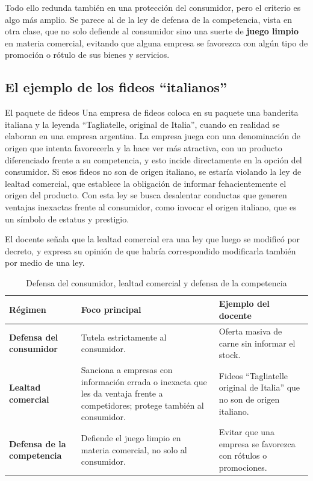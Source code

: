\documentclass[12pt,oneside]{book}
\begin{document}
Todo ello redunda también en una protección del consumidor, pero el criterio es algo más amplio. Se parece al de la ley de defensa de la competencia, vista en otra clase, que no solo defiende al consumidor sino una suerte de \textbf{juego limpio} en materia comercial, evitando que alguna empresa se favorezca con algún tipo de promoción o rótulo de sus bienes y servicios.

\subsection{El ejemplo de los fideos ``italianos''}

\begin{example}{El paquete de fideos}
Una empresa de fideos coloca en su paquete una banderita italiana y la leyenda ``Tagliatelle, original de Italia'', cuando en realidad se elaboran en una empresa argentina. La empresa juega con una denominación de origen que intenta favorecerla y la hace ver más atractiva, con un producto diferenciado frente a su competencia, y esto incide directamente en la opción del consumidor. Si esos fideos no son de origen italiano, se estaría violando la ley de lealtad comercial, que establece la obligación de informar fehacientemente el origen del producto. Con esta ley se busca desalentar conductas que generen ventajas inexactas frente al consumidor, como invocar el origen italiano, que es un símbolo de estatus y prestigio.
\end{example}

El docente señala que la lealtad comercial era una ley que luego se modificó por decreto, y expresa su opinión de que habría correspondido modificarla también por medio de una ley.

\begin{table}[H]
\centering
\caption{Defensa del consumidor, lealtad comercial y defensa de la competencia}
\small
\begin{tabularx}{\textwidth}{
    >{\raggedright\arraybackslash}p{}
    >{\raggedright\arraybackslash}X
    >{\raggedright\arraybackslash}X
}
\toprule
\textbf{Régimen} & \textbf{Foco principal} & \textbf{Ejemplo del docente} \\
\midrule
\textbf{Defensa del consumidor} & Tutela estrictamente al consumidor. & Oferta masiva de carne sin informar el stock. \\
\textbf{Lealtad comercial} & Sanciona a empresas con información errada o inexacta que les da ventaja frente a competidores; protege también al consumidor. & Fideos ``Tagliatelle original de Italia'' que no son de origen italiano. \\
\textbf{Defensa de la competencia} & Defiende el juego limpio en materia comercial, no solo al consumidor. & Evitar que una empresa se favorezca con rótulos o promociones. \\
\bottomrule
\end{tabularx}
\end{table}
\end{document}

